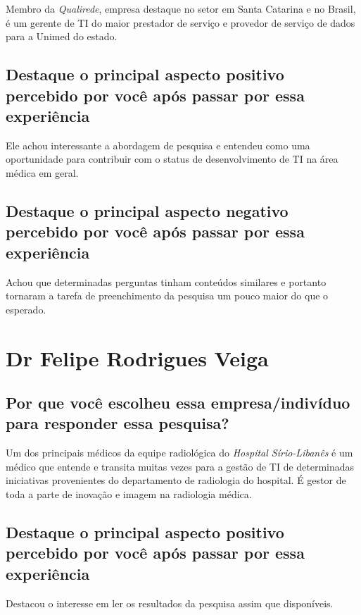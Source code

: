 Membro da \emph{Qualirede}, empresa destaque no setor em Santa Catarina e no Brasil, é um gerente de TI do maior prestador de serviço e provedor de serviço de dados para a Unimed do estado.

\subsection{Destaque o principal aspecto positivo percebido por você após passar por essa experiência}

Ele achou interessante a abordagem de pesquisa e entendeu como uma oportunidade para contribuir com o status de desenvolvimento de TI na área médica em geral.

\subsection{Destaque o principal aspecto negativo percebido por você após passar por essa experiência}

Achou que determinadas perguntas tinham conteúdos similares e portanto tornaram a tarefa de preenchimento da pesquisa um pouco maior do que o esperado. 

\section{Dr Felipe Rodrigues Veiga}

\subsection{Por que você escolheu essa empresa/indivíduo para responder essa pesquisa?}

Um dos principais médicos da equipe radiológica do \emph{Hospital Sírio-Libanês} é um médico que entende e transita muitas vezes para a gestão de TI de determinadas iniciativas provenientes do departamento de radiologia do hospital. É gestor de toda a parte de inovação e imagem na radiologia médica.

\subsection{Destaque o principal aspecto positivo percebido por você após passar por essa experiência}

Destacou o interesse em ler os resultados da pesquisa assim que disponíveis.

